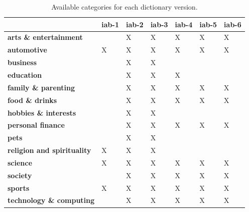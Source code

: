 \begin{table}[h]
\centering
\renewcommand{\arraystretch}{1.25}
\begin{tabular}{l|l|l|l|l|l|l}
                                & {\bf iab-1} & {\bf iab-2} & {\bf iab-3} & {\bf iab-4} & {\bf iab-5} & \textbf{iab-6} \\ \hline
{\bf arts \& entertainment}     &             & X           & X           & X           & X & X       \\ \hline
{\bf automotive}                & X           & X           & X           & X           & X & X       \\ \hline
{\bf business}                  &             & X           & X           &             &   &         \\ \hline
{\bf education}                 &             & X           & X           & X           &   &         \\ \hline
{\bf family \& parenting}       &             & X           & X           & X           & X & X       \\ \hline
{\bf food \& drinks}            &             & X           & X           & X           & X & X       \\ \hline
{\bf hobbies \& interests}      &             & X           & X           &             &   &         \\ \hline
{\bf personal finance}          &             & X           & X           & X           & X & X       \\ \hline
{\bf pets}                      &             & X           & X           &             &   &         \\ \hline
{\bf religion and spirituality} & X           & X           & X           &             &   &         \\ \hline
{\bf science}                   & X           & X           & X           & X           & X & X       \\ \hline
{\bf society}                   &             & X           & X           & X           & X & X       \\ \hline
{\bf sports}                    & X           & X           & X           & X           & X & X       \\ \hline
{\bf technology \& computing}   &             & X           & X           & X           & X & X       \\ 
\end{tabular}
\caption{Available categories for each dictionary version. }
\label{tab:available_categories}
\end{table}

